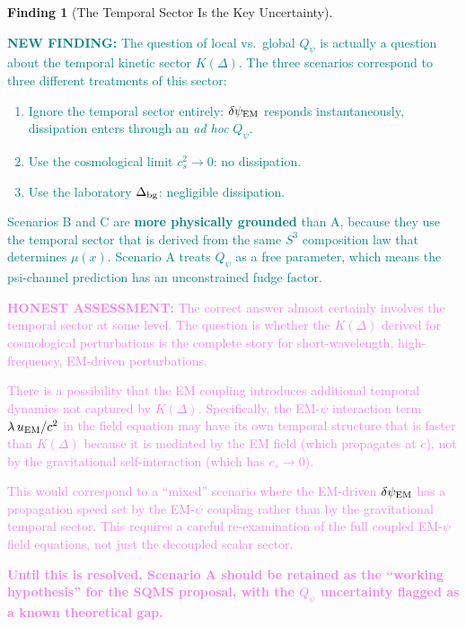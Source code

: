 \documentclass[11pt]{article}
\newcommand{\Qpsi}{Q_\psi}
\newcommand{\dpsiEM}{\delta\psi_{\rm EM}}
\newcommand{\honest}[1]{\textcolor{violet}{\textbf{HONEST ASSESSMENT:} #1}}
\newcommand{\newfinding}[1]{\textcolor{teal}{\textbf{NEW FINDING:} #1}}
\theoremstyle{definition}
\newtheorem{finding}[theorem]{Finding}
\theoremstyle{remark}
\begin{document}
\begin{finding}[The Temporal Sector Is the Key Uncertainty]
\label{find:temporal}
\newfinding{The question of local vs.\ global $\Qpsi$ is actually
a question about the temporal kinetic sector $K(\Delta)$. The three
scenarios correspond to three different treatments of this sector:

\begin{enumerate}[nosep]
\item[(A)] Ignore the temporal sector entirely: $\dpsiEM$ responds
  instantaneously, dissipation enters through an \emph{ad hoc} $\Qpsi$.
\item[(B)] Use the cosmological limit $c_s^2 \to 0$: no dissipation.
\item[(C)] Use the laboratory $\Delta_{\rm bg}$: negligible dissipation.
\end{enumerate}

Scenarios B and C are \textbf{more physically grounded} than A,
because they use the temporal sector that is derived from the same
$S^3$ composition law that determines $\mu(x)$. Scenario A treats
$\Qpsi$ as a free parameter, which means the psi-channel prediction
has an unconstrained fudge factor.}

\honest{The correct answer almost certainly involves the temporal
sector at some level. The question is whether the $K(\Delta)$
derived for cosmological perturbations is the complete story for
short-wavelength, high-frequency, EM-driven perturbations.

There is a possibility that the EM coupling introduces additional
temporal dynamics not captured by $K(\Delta)$. Specifically, the
EM-$\psi$ interaction term $\lambda\,u_{\rm EM}/c^2$ in the field
equation may have its own temporal structure that is faster than
$K(\Delta)$ because it is mediated by the EM field (which propagates
at $c$), not by the gravitational self-interaction (which has
$c_s \to 0$).

This would correspond to a ``mixed'' scenario where the EM-driven
$\dpsiEM$ has a propagation speed set by the EM-$\psi$ coupling
rather than by the gravitational temporal sector. This requires a
careful re-examination of the full coupled EM-$\psi$ field equations,
not just the decoupled scalar sector.

\textbf{Until this is resolved, Scenario A should be retained as
the ``working hypothesis'' for the SQMS proposal, with the $\Qpsi$
uncertainty flagged as a known theoretical gap.}}
\end{finding}
\end{document}

